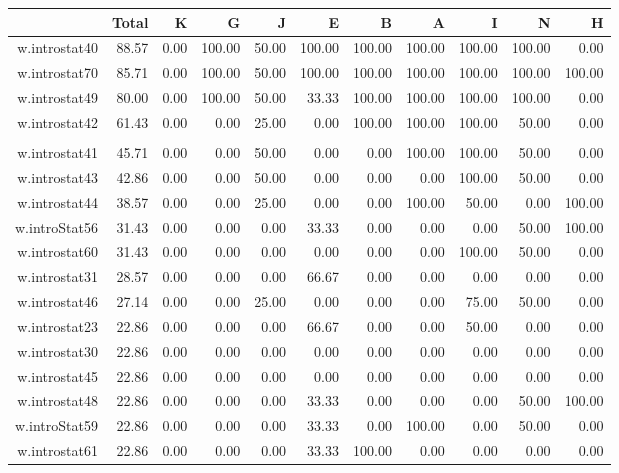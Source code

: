 \documentclass[12pt,english,nohyper]{tufte-handout}\usepackage[]{graphicx}\usepackage[]{color}
\begin{document}
\begin{longtable}{rrrrrrrrrrr}
  \hline
 & Total & K & G & J & E & B & A & I & N & H \\ 
  \hline
w.introstat40 & 88.57 & 0.00 & 100.00 & 50.00 & 100.00 & 100.00 & 100.00 & 100.00 & 100.00 & 0.00 \\ 
  w.introstat70 & 85.71 & 0.00 & 100.00 & 50.00 & 100.00 & 100.00 & 100.00 & 100.00 & 100.00 & 100.00 \\ 
  w.introstat49 & 80.00 & 0.00 & 100.00 & 50.00 & 33.33 & 100.00 & 100.00 & 100.00 & 100.00 & 0.00 \\ 
  w.introstat42 & 61.43 & 0.00 & 0.00 & 25.00 & 0.00 & 100.00 & 100.00 & 100.00 & 50.00 & 0.00 \\ 
   &  &  &  &  &  &  &  &  &  &  \\ 
  w.introstat41 & 45.71 & 0.00 & 0.00 & 50.00 & 0.00 & 0.00 & 100.00 & 100.00 & 50.00 & 0.00 \\ 
  w.introstat43 & 42.86 & 0.00 & 0.00 & 50.00 & 0.00 & 0.00 & 0.00 & 100.00 & 50.00 & 0.00 \\ 
  w.introstat44 & 38.57 & 0.00 & 0.00 & 25.00 & 0.00 & 0.00 & 100.00 & 50.00 & 0.00 & 100.00 \\ 
  w.introStat56 & 31.43 & 0.00 & 0.00 & 0.00 & 33.33 & 0.00 & 0.00 & 0.00 & 50.00 & 100.00 \\ 
  w.introstat60 & 31.43 & 0.00 & 0.00 & 0.00 & 0.00 & 0.00 & 0.00 & 100.00 & 50.00 & 0.00 \\ 
  w.introstat31 & 28.57 & 0.00 & 0.00 & 0.00 & 66.67 & 0.00 & 0.00 & 0.00 & 0.00 & 0.00 \\ 
  w.introstat46 & 27.14 & 0.00 & 0.00 & 25.00 & 0.00 & 0.00 & 0.00 & 75.00 & 50.00 & 0.00 \\ 
  w.introstat23 & 22.86 & 0.00 & 0.00 & 0.00 & 66.67 & 0.00 & 0.00 & 50.00 & 0.00 & 0.00 \\ 
  w.introstat30 & 22.86 & 0.00 & 0.00 & 0.00 & 0.00 & 0.00 & 0.00 & 0.00 & 0.00 & 0.00 \\ 
  w.introstat45 & 22.86 & 0.00 & 0.00 & 0.00 & 0.00 & 0.00 & 0.00 & 0.00 & 0.00 & 0.00 \\ 
  w.introstat48 & 22.86 & 0.00 & 0.00 & 0.00 & 33.33 & 0.00 & 0.00 & 0.00 & 50.00 & 100.00 \\ 
  w.introStat59 & 22.86 & 0.00 & 0.00 & 0.00 & 33.33 & 0.00 & 100.00 & 0.00 & 50.00 & 0.00 \\ 
  w.introstat61 & 22.86 & 0.00 & 0.00 & 0.00 & 33.33 & 100.00 & 0.00 & 0.00 & 0.00 & 0.00 \\ 

\end{longtable}
\end{document}
